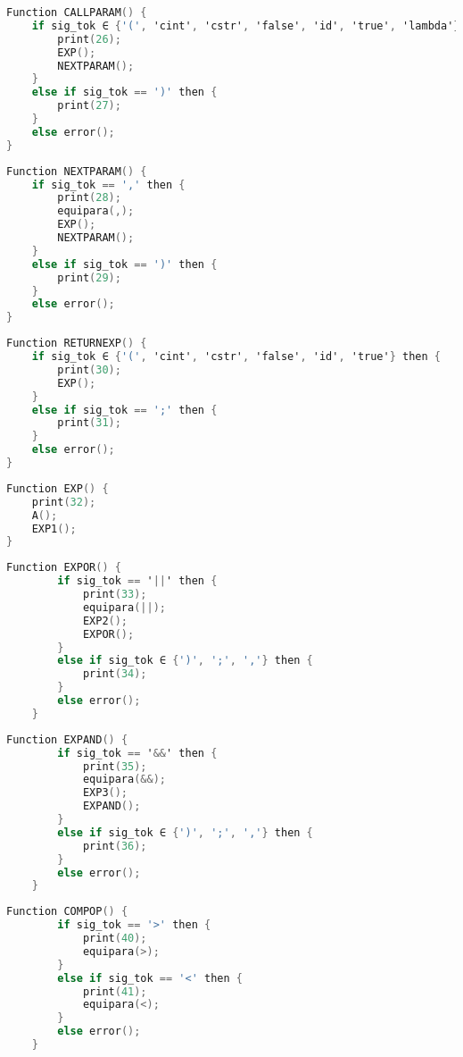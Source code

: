 \begin{lstlisting}[language=C, caption={CALLPARAM}]
Function CALLPARAM() {
    if sig_tok ∈ {'(', 'cint', 'cstr', 'false', 'id', 'true', 'lambda'} then {
        print(26);
        EXP();
        NEXTPARAM();
    }
    else if sig_tok == ')' then {
        print(27);
    }
    else error();
}
\end{lstlisting}

\begin{lstlisting}[language=C, caption={NEXTPARAM}]
Function NEXTPARAM() {
    if sig_tok == ',' then {
        print(28);
        equipara(,);
        EXP();
        NEXTPARAM();
    }
    else if sig_tok == ')' then {
        print(29);
    }
    else error();
}
\end{lstlisting}

\begin{lstlisting}[language=C, caption={RETURNEXP}]
Function RETURNEXP() {
    if sig_tok ∈ {'(', 'cint', 'cstr', 'false', 'id', 'true'} then {
        print(30);
        EXP();
    }
    else if sig_tok == ';' then {
        print(31);
    }
    else error();
}
\end{lstlisting}

\begin{lstlisting}[language=C, caption={EXP}]
Function EXP() {
    print(32);
    A();
    EXP1();
}
\end{lstlisting}

\newpage

\begin{lstlisting}[language=C, caption={EXP1}]
    Function EXPOR() {
        if sig_tok == '||' then {
            print(33);
            equipara(||);
            EXP2();
            EXPOR();
        }
        else if sig_tok ∈ {')', ';', ','} then {
            print(34);
        }
        else error();
    }
    \end{lstlisting}

\begin{lstlisting}[language=C, caption={EXP1}]
    Function EXPAND() {
        if sig_tok == '&&' then {
            print(35);
            equipara(&&);
            EXP3();
            EXPAND();
        }
        else if sig_tok ∈ {')', ';', ','} then {
            print(36);
        }
        else error();
    }
\end{lstlisting}

\begin{lstlisting}[language=C, caption={EXP1}]
    Function COMPOP() {
        if sig_tok == '>' then {
            print(40);
            equipara(>);
        }
        else if sig_tok == '<' then {
            print(41);
            equipara(<);
        }
        else error();
    }
\end{lstlisting}



